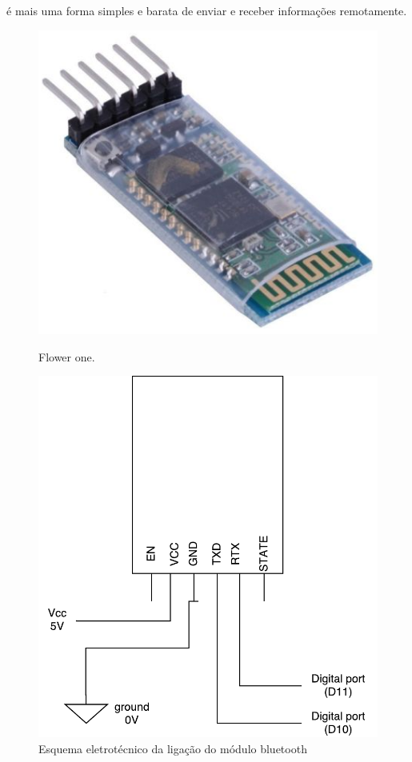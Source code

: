 é mais uma forma simples e barata de enviar e receber informações remotamente.


\newpage
\begin{figure}[h]
	\centering
	\begin{minipage}[b]{0.4\textwidth}
		\includegraphics[width=\textwidth]{img/hardware/bluetooth_zs-040.png}
		\caption{Flower one.}
	\end{minipage}
	\hfill
	\begin{minipage}[b]{0.4\textwidth}
		\includegraphics[width=\textwidth]{img/comm-blue/electronic-sensors.pdf}
		\caption{Esquema eletrotécnico da ligação do módulo bluetooth}
	\end{minipage}
\end{figure}



